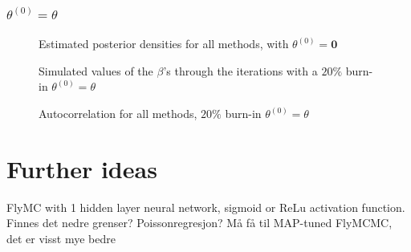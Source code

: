 \subsubsection{$\theta^{\left(0\right)} = \theta$}

\begin{figure}%
    \centering
    \qquad
    \caption{Estimated posterior densities for all methods, with $\theta^{\left(0\right)} = \mathbf{0}$}%
    \label{fig:density_50k_02_06_theta3}%
\end{figure}


\begin{figure}%
    \centering
    \qquad
    \caption{Simulated values of the $\beta$'s through the iterations with a $20\%$ burn-in $\theta^{\left(0\right)} = \theta$}%
    \label{fig:chain_50k_02_06_theta3}%
\end{figure}

\begin{figure}%
    \centering
    \qquad
    \caption{Autocorrelation for all methods, $20\%$ burn-in $\theta^{\left(0\right)} = \theta$}%
    \label{fig:autocorrelation_50k_02_06_theta3}%
\end{figure}

\section*{Further ideas}
FlyMC with 1 hidden layer neural network, sigmoid or ReLu activation function. Finnes det nedre grenser? 
Poissonregresjon?
Må få til MAP-tuned FlyMCMC, det er visst mye bedre